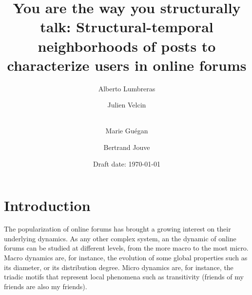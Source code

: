 \documentclass[smallextended]{svjour3}          %
\begin{document}
\title{You are the way you structurally talk: Structural-temporal neighborhoods of posts to characterize users in online forums}

\author{Alberto Lumbreras \and
        Julien Velcin  \and\\
        Marie Guégan \and
        Bertrand Jouve
}


\date{Draft date: \today}

\maketitle

\section{Introduction}\label{sec:introduction}

The popularization of online forums has brought a growing interest on their underlying dynamics. As any other complex system, an the dynamic of online forums can be studied at different levels, from the more macro to the most micro. Macro dynamics are, for instance, the evolution of some global properties such as its diameter, or its distribution degree. Micro dynamics are, for instance, the triadic motifs that represent local phenomena such as transitivity (friends of my friends are also my friends).
\end{document}
